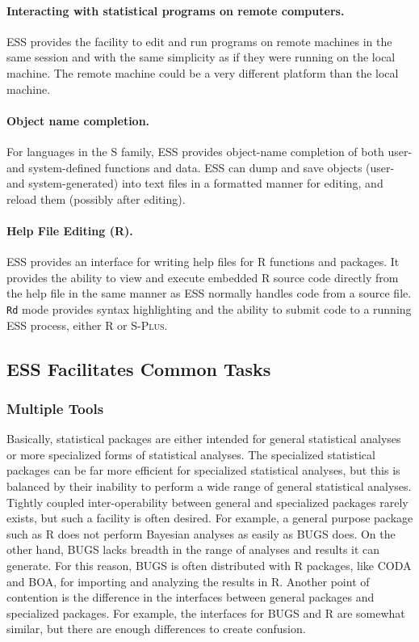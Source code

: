 \documentclass{article}
\newcommand*{\Splus}{\textsc{S-Plus}}
\newcommand{\stexttt}[1]{{\small\texttt{#1}}}
\begin{document}
\paragraph{Interacting with statistical programs on remote computers.}
ESS provides the facility to edit and run programs on remote machines
in the same session and with the same simplicity as if they were
running on the local machine.  The remote machine could be a very
different platform than the local machine.

\paragraph{Object name completion.}
For languages in the S family,
ESS provides object-name completion of both user- and
system-defined functions and data.  ESS can dump and save objects
(user- and system-generated) into text files in a formatted manner for
editing, and reload them (possibly after editing).

\paragraph{Help File Editing (R).}
ESS provides an interface for writing help files for R functions
and packages.  It provides the ability to view and execute embedded R
source code directly from the help file in the same manner as ESS
normally handles code from a source file.  \stexttt{Rd} mode provides
syntax highlighting and the ability to submit code to a running ESS
process, either R or \Splus.


\subsection{ESS Facilitates Common Tasks}
\label{sec:ess-facil-comm}

\subsubsection{Multiple Tools}
\label{sec:multiple-tools}

Basically, statistical packages are either intended for general
statistical analyses or more specialized forms of statistical analyses.
The specialized statistical packages can be far more efficient for
specialized statistical analyses, but this is balanced by their inability
to perform a wide range of general statistical analyses.  Tightly coupled
inter-operability between general and specialized packages rarely exists,
but such a facility is often desired.  For example, a general purpose
package such as R does not perform Bayesian analyses as easily as BUGS does.
On the other hand, BUGS lacks breadth in the range of analyses and results
it can generate.  For this reason, BUGS is often distributed with R packages,
like CODA and BOA, for importing and analyzing the results in R.  Another
point of contention is the difference in the interfaces between general
packages and specialized packages.  For example, the interfaces for BUGS
and R are somewhat similar, but there are enough differences to create confusion.
\end{document}
